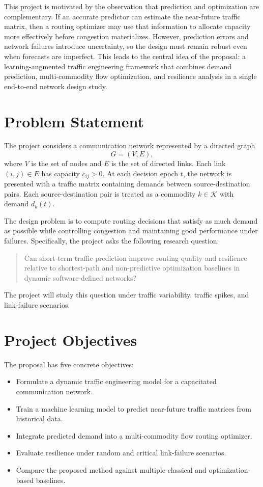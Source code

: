 \documentclass[11pt]{article}
\begin{document}
This project is motivated by the observation that prediction and optimization are complementary. If an accurate predictor can estimate the near-future traffic matrix, then a routing optimizer may use that information to allocate capacity more effectively before congestion materializes. However, prediction errors and network failures introduce uncertainty, so the design must remain robust even when forecasts are imperfect. This leads to the central idea of the proposal: a learning-augmented traffic engineering framework that combines demand prediction, multi-commodity flow optimization, and resilience analysis in a single end-to-end network design study.

\section{Problem Statement}
The project considers a communication network represented by a directed graph
\[
G = (V, E),
\]
where $V$ is the set of nodes and $E$ is the set of directed links. Each link $(i,j) \in E$ has capacity $c_{ij} > 0$. At each decision epoch $t$, the network is presented with a traffic matrix containing demands between source-destination pairs. Each source-destination pair is treated as a commodity $k \in \mathcal{K}$ with demand $d_k(t)$.

The design problem is to compute routing decisions that satisfy as much demand as possible while controlling congestion and maintaining good performance under failures. Specifically, the project asks the following research question:

\begin{quote}
Can short-term traffic prediction improve routing quality and resilience relative to shortest-path and non-predictive optimization baselines in dynamic software-defined networks?
\end{quote}

The project will study this question under traffic variability, traffic spikes, and link-failure scenarios.

\section{Project Objectives}
The proposal has five concrete objectives:
\begin{itemize}
    \item Formulate a dynamic traffic engineering model for a capacitated communication network.
    \item Train a machine learning model to predict near-future traffic matrices from historical data.
    \item Integrate predicted demand into a multi-commodity flow routing optimizer.
    \item Evaluate resilience under random and critical link-failure scenarios.
    \item Compare the proposed method against multiple classical and optimization-based baselines.
\end{itemize}
\end{document}
